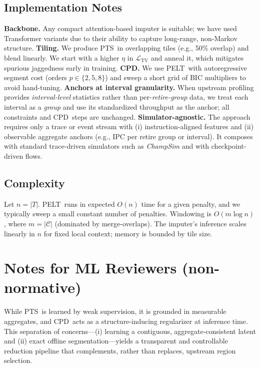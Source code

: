 \documentclass[10pt,journal,compsoc]{IEEEtran}
\newcommand{\pts}{\textsc{PTS}}
\newcommand{\cpd}{\textsc{CPD}}
\newcommand{\pelt}{\textsc{PELT}}
\begin{document}
\subsection{Implementation Notes}
\textbf{Backbone.} Any compact attention-based imputer is suitable; we have used Transformer variants due to their ability to capture long-range, non-Markov structure.
\textbf{Tiling.} We produce \pts\ in overlapping tiles (e.g., 50\% overlap) and blend linearly. We start with a higher \(\eta\) in \(\mathcal{L}_{\mathrm{TV}}\) and anneal it, which mitigates spurious jaggedness early in training.
\textbf{CPD.} We use \pelt\ with autoregressive segment cost (orders \(p\in\{2,5,8\}\)) and sweep a short grid of BIC multipliers to avoid hand-tuning.
\textbf{Anchors at interval granularity.}
When upstream profiling provides \emph{interval-level} statistics rather than per-\emph{retire-group} data, we treat each interval as a \emph{group} and use its standardized throughput as the anchor; all constraints and \cpd\ steps are unchanged.
\textbf{Simulator-agnostic.}
The approach requires only a trace or event stream with (i) instruction-aligned features and (ii) observable aggregate anchors (e.g., IPC per retire group or interval). It composes with standard trace-driven simulators such as \emph{ChampSim} and with checkpoint-driven flows.
\subsection{Complexity}
Let \(n=|T|\). \pelt\ runs in expected \(O(n)\) time for a given penalty, and we typically sweep a small constant number of penalties. Windowing is \(O(m\log n)\), where \(m=|\mathcal{C}|\) (dominated by merge-overlaps). The imputer’s inference scales linearly in \(n\) for fixed local context; memory is bounded by tile size.
\section*{Notes for ML Reviewers (non-normative)}
While \pts\ is learned by weak supervision, it is grounded in measurable aggregates, and \cpd\ acts as a structure-inducing regularizer at inference time. This separation of concerns—(i) learning a contiguous, aggregate-consistent latent and (ii) exact offline segmentation—yields a transparent and controllable reduction pipeline that complements, rather than replaces, upstream region selection.


\end{document}
